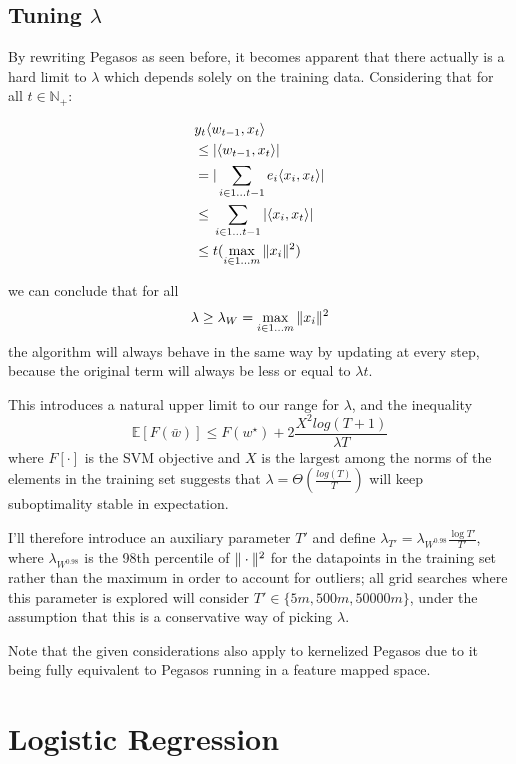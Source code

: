 \subsection{Tuning $\lambda{}$}
By rewriting Pegasos as seen before, it becomes apparent that there actually is a hard limit to $\lambda{}$ which depends solely on the training data. Considering that for all $t \in \mathbb{N}_+$:

\begin{equation*}
    \begin{aligned}
        & y_t\langle{} w_{t-1}, x_t \rangle{} \\
        & \leq \vert{} \langle{} w_{t-1}, x_t \rangle{} \vert{} \\
        & = \vert{} \sum_{i \in 1 \dots{} t-1}{e_i\langle{} x_i, x_t \rangle{}} \vert{} \\
        & \leq{} \sum_{i \in 1 \dots{} t-1}{\vert{} \langle{} x_i, x_t \rangle{} \vert{}} \\
        & \leq{} t(\max_{i \in 1 \dots{} m}{\Vert{} x_i \Vert{}^2})
    \end{aligned}
\end{equation*}

we can conclude that for all \[
\lambda{} \geq \lambda{}_W = \max_{i \in 1 \dots{} m}{\Vert{} x_i \Vert{}^2}
\] the algorithm will always behave in the same way by updating at every step, because the original term will always be less or equal to $\lambda{}t$.

This introduces a natural upper limit to our range for $\lambda{}$, and the inequality \[
 \mathbb{E}[F(\bar{w})] \leq F(w^\star{}) + 2\frac{X^2{log}(T + 1)}{\lambda{}T}
\] where $F[\cdot{}]$ is the SVM objective and $X$ is the largest among the norms of the elements in the training set suggests that $\lambda{} = \Theta{}(\frac{log(T)}{T})$ will keep suboptimality stable in expectation.

I'll therefore introduce an auxiliary parameter $T'$ and define $\lambda{}_{T'} = \lambda{}_{W^{0.98}}\frac{\log{T'}}{T'}$, where $\lambda_{W^{0.98}}$ is the 98th percentile of $\Vert{} \cdot{} \Vert{}^2$ for the datapoints in the training set rather than the maximum in order to account for outliers; all grid searches where this parameter is explored will consider $T' \in \{ 5m, 500m, 50000m \}$, under the assumption that this is a conservative way of picking $\lambda{}$.

Note that the given considerations also apply to kernelized Pegasos due to it being fully equivalent to Pegasos running in a feature mapped space.

\section{Logistic Regression}

